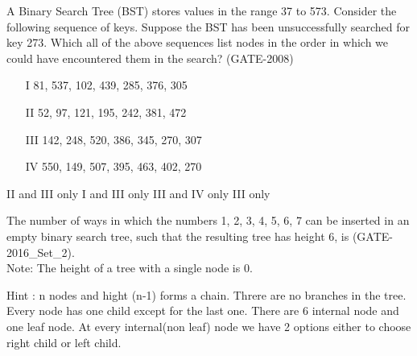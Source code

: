 \begin{questyle}
  \question  A Binary Search Tree (BST) stores values in the range 37 to 573. Consider the following
             sequence of keys. Suppose the BST has been unsuccessfully searched for key 273. Which all
             of the above sequences list nodes in the order in which we could have encountered them
             in the search? (GATE-2008)
    \begin{enumerate}
    \item[I] 81, 537, 102, 439, 285, 376, 305
    \item[II] 52, 97, 121, 195, 242, 381, 472
    \item[III] 142, 248, 520, 386, 345, 270, 307
    \item[IV] 550, 149, 507, 395, 463, 402, 270
    \end{enumerate}
  \begin{choices}
    \choice         II and III only
    \choice         I and III only
    \choice         III and IV only
    \CorrectChoice  III only
  \end{choices}
\end{questyle}

\begin{questyle}
  \question  The number of ways in which the numbers 1, 2, 3, 4, 5, 6, 7 can be inserted in an
             empty binary search tree, such that the resulting tree has height 6, is \fillin[ 64 (\(2^6\))] (GATE-2016\_Set\_2).\\
             Note: The height of a tree with a single node is 0.
\end{questyle}

        Hint : n nodes and hight (n-1) forms a chain. Threre are no branches in the tree.
        Every node has one child except for the last one. There are 6 internal node and one leaf node.
        At every internal(non leaf) node we have 2 options either to choose right child or left child.
